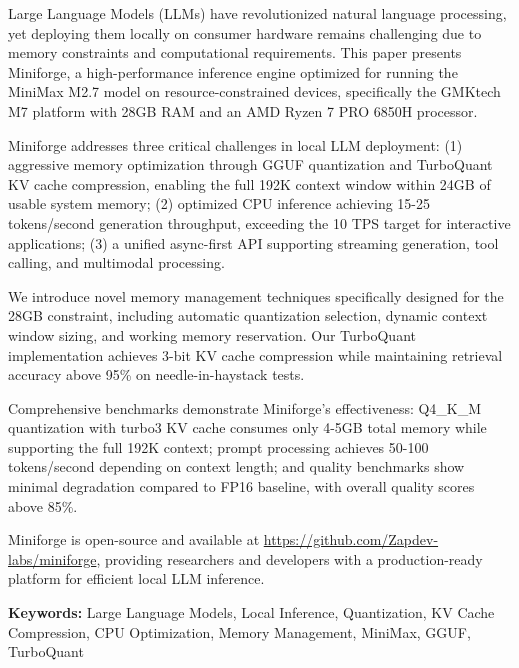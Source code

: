 Large Language Models (LLMs) have revolutionized natural language processing, yet deploying them locally on consumer hardware remains challenging due to memory constraints and computational requirements. This paper presents Miniforge, a high-performance inference engine optimized for running the MiniMax M2.7 model on resource-constrained devices, specifically the GMKtech M7 platform with 28GB RAM and an AMD Ryzen 7 PRO 6850H processor.

Miniforge addresses three critical challenges in local LLM deployment: (1) aggressive memory optimization through GGUF quantization and TurboQuant KV cache compression, enabling the full 192K context window within 24GB of usable system memory; (2) optimized CPU inference achieving 15-25 tokens/second generation throughput, exceeding the 10 TPS target for interactive applications; (3) a unified async-first API supporting streaming generation, tool calling, and multimodal processing.

We introduce novel memory management techniques specifically designed for the 28GB constraint, including automatic quantization selection, dynamic context window sizing, and working memory reservation. Our TurboQuant implementation achieves 3-bit KV cache compression while maintaining retrieval accuracy above 95\% on needle-in-haystack tests.

Comprehensive benchmarks demonstrate Miniforge's effectiveness: Q4\_K\_M quantization with turbo3 KV cache consumes only 4-5GB total memory while supporting the full 192K context; prompt processing achieves 50-100 tokens/second depending on context length; and quality benchmarks show minimal degradation compared to FP16 baseline, with overall quality scores above 85\%.

Miniforge is open-source and available at \url{https://github.com/Zapdev-labs/miniforge}, providing researchers and developers with a production-ready platform for efficient local LLM inference.

\textbf{Keywords:} Large Language Models, Local Inference, Quantization, KV Cache Compression, CPU Optimization, Memory Management, MiniMax, GGUF, TurboQuant
